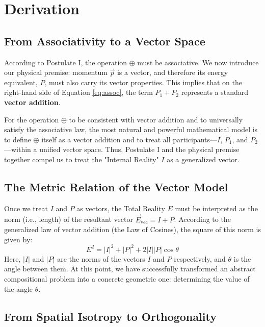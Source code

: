 \documentclass[12pt, a4paper]{article}
\begin{document}
\section{Derivation}

\subsection{From Associativity to a Vector Space}

According to Postulate I, the operation $\oplus$ must be associative. We now introduce our physical premise: momentum $\vec{p}$ is a vector, and therefore its energy equivalent, $P$, must also carry its vector properties. This implies that on the right-hand side of Equation \eqref{eq:assoc}, the term $P_1 + P_2$ represents a standard \textbf{vector addition}.

For the operation $\oplus$ to be consistent with vector addition and to universally satisfy the associative law, the most natural and powerful mathematical model is to define $\oplus$ itself as a vector addition and to treat all participants—$I$, $P_1$, and $P_2$—within a unified vector space. Thus, Postulate I and the physical premise together compel us to treat the "Internal Reality" $I$ as a generalized vector.

\subsection{The Metric Relation of the Vector Model}

Once we treat $I$ and $P$ as vectors, the Total Reality $E$ must be interpreted as the norm (i.e., length) of the resultant vector $\vec{E}_{\text{vec}} = I + P$. According to the generalized law of vector addition (the Law of Cosines), the square of this norm is given by:
\begin{equation}
    E^2 = |I|^2 + |P|^2 + 2|I||P|\cos\theta
    \label{eq:cosine}
\end{equation}
Here, $|I|$ and $|P|$ are the norms of the vectors $I$ and $P$ respectively, and $\theta$ is the angle between them. At this point, we have successfully transformed an abstract compositional problem into a concrete geometric one: determining the value of the angle $\theta$.

\subsection{From Spatial Isotropy to Orthogonality}
\end{document}
